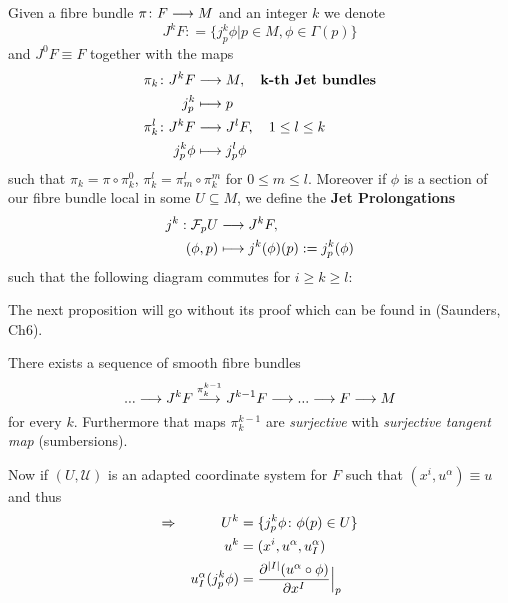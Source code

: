 \begin{definition}
  Given a fibre bundle $\pi\colon  F\longrightarrow M$ and an integer $k$ we denote
  $$ J^k F \colon = \{j^k_p \phi | p \in M, \phi \in \Gamma(p) \}$$
  and $J^0 F \equiv F$ together with the maps
  \begin{align*}
    \pi_k \colon  J^k F &\lra M, \quad \textbf{k-th Jet bundles}\\
    j^k_p &\lmap p \\
    \pi^l_k\colon  J^kF &\lra J^l F, \quad 1 \leq l \leq k \\
    j^k_p  \phi &\lmap j^l_p \phi
  \end{align*}
  such that $\pi_k = \pi \circ \pi^0_k$, $\pi^l_k = \pi^l_m \circ \pi^m_k$ for $0 \leq m \leq l$. Moreover if $\phi$ is a section of our fibre bundle local in some $U\subseteq M$, we define the \textbf{Jet Prolongations}
  \begin{align*}
    j^k: \mathcal{F}_p U &\lra J^k F,\\
    (\phi, p) &\lmap j^k(\phi)(p) := j^k_p(\phi)
  \end{align*}
  such that the following diagram commutes for $i \geq k \geq l$:
  \begin{center}
  \end{center}
\end{definition}

The next proposition will go without its proof which can be found in (Saunders, Ch6). %

\begin{prop}
 There exists a sequence of smooth fibre bundles
 $$ ... \longrightarrow J^kF \overset{\pi^{k-1}_k}{\longrightarrow} J^{k-1}F \longrightarrow ... \longrightarrow F \longrightarrow M $$
 for every $k$. Furthermore that maps $\pi^{k-1}_k$ are \emph{surjective} with \emph{surjective tangent map} (sumbersions).
\end{prop}

Now if $(U, \mathcal{U})$ is an adapted coordinate system for $F$ such that $(x^i, u^\alpha) \equiv u$ and thus
\begin{align*}
  \Rightarrow \quad \quad \quad U^k &= \{j^k_p \phi \colon  \phi(p) \in U\}\\
  u^k &= (x^i, u^\alpha, u_I^\alpha)\\
  u^\alpha_I(j^k_p \phi) &= \dell{^{|I|} (u^\alpha \circ \phi)}{x^I}\Big|_p
\end{align*}

